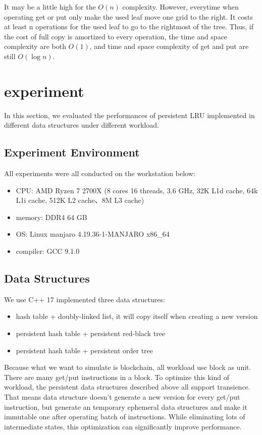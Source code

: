 \documentclass[conference]{IEEEtran}
\begin{document}
It may be a little high for the $O(n)$ complexity.
However, everytime when operating get or put only
make the used leaf move one grid to the right.
It costs  at least n operations for the used leaf
to go to the rightmost of the tree. Thus, if the
cost of full copy is amortized to every operation,
the time and space complexity are both $O(1)$,
and time and space complexity of get and put are still $O(\log n)$.

\section{experiment}
In this section, we evaluated the performances of 
persistent LRU implemented in different data 
structures under different workload.

\subsection{Experiment Environment}
All experiments were all conducted on the workstation below:

\begin{itemize}
\item CPU: AMD Ryzen 7 2700X (8 cores 16 threads, 3.6 GHz, 32K L1d cache, 64k L1i cache, 512K L2 cache、8M L3 cache)
\item memory: DDR4 64 GB
\item OS: Linux manjaro 4.19.36-1-MANJARO x86\_64
\item compiler: GCC 9.1.0
\end{itemize}

\subsection{Data Structures}

We use C++ 17 implemented three data structures:

\begin{itemize}
\item hash table + doubly-linked list, it will copy itself when creating a new version
\item persistent hash table + persistent red-black tree
\item persistent hash table + persistent order tree
\end{itemize}

Because what we want to simulate is blockchain,
all workload use block as unit.
There are many get/put instructions in a block.
To optimize this kind of workload,
the persistent data structures described above all
support transience. That means data structure doesn't 
generate a new version for every get/put instruction,
but generate an temporary ephemeral data structures and
make it immutable one after operating batch of instructions.
While eliminating lots of intermediate states,
this optimization can significantly improve performance.
\end{document}
